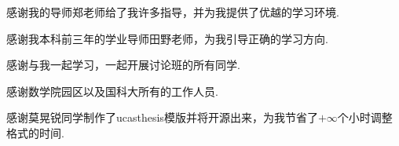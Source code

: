 感谢我的导师郑老师给了我许多指导，并为我提供了优越的学习环境.

感谢我本科前三年的学业导师田野老师，为我引导正确的学习方向.

感谢与我一起学习，一起开展讨论班的所有同学.

感谢数学院园区以及国科大所有的工作人员.

感谢莫晃锐同学制作了ucasthesis模版并将开源出来，为我节省了$+\infty$个小时调整格式的时间.
